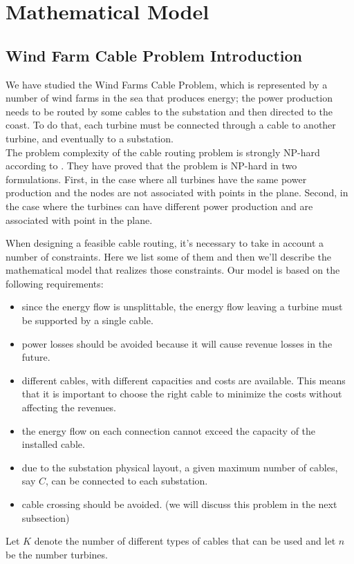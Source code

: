 
\chapter{Mathematical Model}
\label{chp:2-Model}

\section{Wind Farm Cable Problem Introduction}
We have studied the Wind Farms Cable Problem, which is represented by a number of wind farms in the sea that produces energy; the power production needs to be routed by some cables to the substation and then directed to the coast.
To do that, each turbine must be connected through a cable to another turbine, and eventually to a substation.\\

The problem complexity of the cable routing problem is strongly NP-hard according to \cite{wfcp}. They have proved that the problem is NP-hard in two formulations. First, in the case where all turbines have the same power production and the nodes are not associated with points in the plane. Second, in the case where the turbines can have different power production and are associated with point in the plane. 

When designing a feasible cable routing, it's necessary to take in account a number of constraints. Here we list some of them and then we'll describe the mathematical model that realizes those constraints. Our model is based on the following requirements:

\begin{itemize}
\item since the energy flow is unsplittable, the energy flow leaving a turbine must be supported by a single cable.
\item power losses should be avoided because it will cause revenue losses in the future.
\item different cables, with different capacities and costs are available. This means that it is important to choose the right cable to minimize the costs without affecting the revenues. 
\item the energy flow on each connection cannot exceed the capacity of the installed cable.
\item due to the substation physical layout, a given maximum number of cables, say $C$, can be connected to each substation.
\item cable crossing should be avoided. (we will discuss this problem in the next subsection)
\end{itemize}
Let $K$ denote the number of different types of cables that can be used and let $n$ be the number turbines. 

